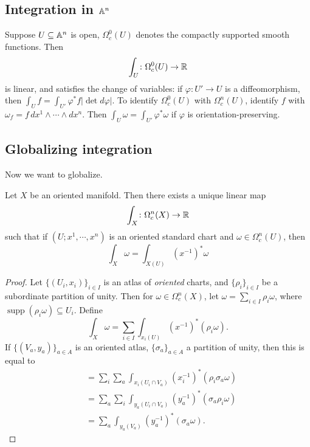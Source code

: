 \subsection{Integration in $\mathbb{A}^n $}
Suppose $U \subseteq \mathbb{A}^n $ is open, $\Omega^0_c(U)$ denotes the compactly supported smooth functions. Then \[
    \int _U \colon \Omega^0_c(U) \to \mathbb{R}
\] is linear, and satisfies the change of variables: if $\varphi  \colon U' \to U$ is a diffeomorphism, then $\int _U f=\int _{U'}\varphi ^* f|\det d \varphi | $. To identify $\Omega^0_c(U)$ with $\Omega_c^n (U)$, identify $f$ with $\omega_f=f\, dx^1\wedge \cdots \wedge dx^n $. Then $\int _U \omega=\int _{U'}\varphi ^* \omega$ if $\varphi $ is orientation-preserving. 

\subsection{Globalizing integration}
Now we want to globalize.
\begin{theorem}
    Let $X$ be an oriented manifold. Then there exists a unique linear map \[
        \int _X \colon \Omega_c^n (X) \to \mathbb{R}
    \] such that if $(U;x^1,\cdots ,x^n )$ is an oriented standard chart and $\omega \in \Omega^n _c(U)$, then \[
    \int _X \omega = \int _{X(U)}(x^{-1})^*\omega 
    \] 
\end{theorem}

\begin{proof}
    Let $\{(U_i ,x_i )\} _{i \in I}$ is an atlas of \emph{oriented} charts, and $\{\rho _i \} _{i \in I}$ be a subordinate partition of unity. Then for $\omega \in \Omega_c^n (X)$, let $\omega=\sum _{i \in I}\rho _i \omega$, where $\operatorname{supp}(\rho _i \omega) \subseteq U_i $. Define \[
        \int _X\omega = \sum _{i \in I}\int _{x_i (U)}( x ^{-1})^*(\rho _i \omega) .
    \] If $\{(V_{a},y_a)\} _{a \in A}$ is an oriented atlas, $\{\sigma_a\} _{a \in A}$ a partition of unity, then this is equal to 
    \begin{align*}
        &=\sum _i  \sum _a \int _{x_i (U_i \cap V_a)}( x_i  ^{-1})^*(\rho _i \sigma_a\omega)\\
        &=\sum_a\sum_i  \int _{y_a(U_i \cap V_a)}(y^{-1}_a)^*(\sigma_a \rho _i \omega)\\
        &=\sum _a \int _{y_a(V_a)}(y^{-1}_a)^*(\sigma_a\omega).
    \end{align*}
\end{proof}

